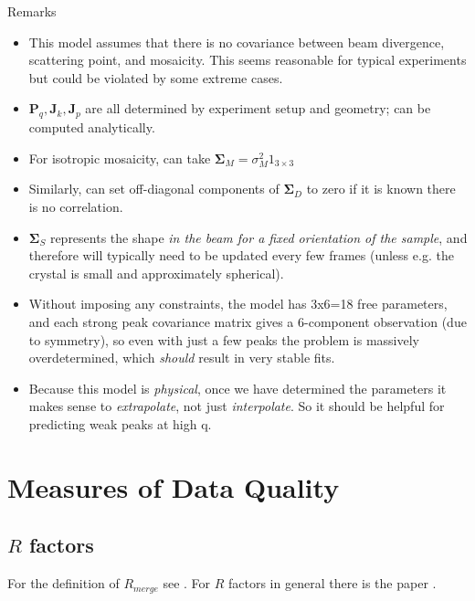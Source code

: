 \documentclass[11pt,a4paper]{article}
\def\v#1{\bm{{#1}}}
\begin{document}
Remarks
\begin{itemize}
  \item This model assumes that there is no covariance between beam divergence, scattering point, and
    mosaicity. This seems reasonable for typical experiments but could be violated by some extreme cases.
  \item $\v{P}_q, \v{J}_k, \v{J}_p$ are all determined by experiment setup and geometry; can be computed analytically.
  \item For isotropic mosaicity, can take $\v\Sigma_M = \sigma_M^2 1_{3\times 3}$
  \item Similarly, can set off-diagonal components of $\v\Sigma_D$ to zero if it is known there is no correlation.
  \item $\v\Sigma_S$ represents the shape \emph{in the beam for a fixed orientation of the sample}, and therefore
    will typically need to be updated every few frames (unless e.g. the crystal is small and approximately spherical).

  \item Without imposing any constraints, the model has 3x6=18 free parameters, and each strong peak covariance matrix gives
    a 6-component observation (due to symmetry), so even with just a few peaks the problem is massively overdetermined,
    which \emph{should} result in very stable fits.

  \item Because this model is \emph{physical}, once we have determined the parameters it makes sense to \emph{extrapolate},
    not just \emph{interpolate}. So it should be helpful for predicting weak peaks at high q.
\end{itemize}


\section{Measures of Data Quality} \label{merged-statistics}

\subsection{\boldmath$R$ factors}

For the definition of $R_{merge}$ see \cite{KaDi12}. For $R$ factors in general there is the paper \cite{Eva11}.
\end{document}
